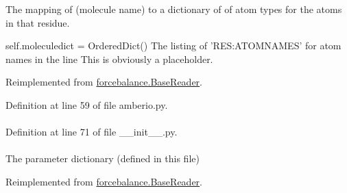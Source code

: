\-The mapping of (molecule name) to a dictionary of of atom types for the atoms in that residue. 

self.\-moleculedict = \-Ordered\-Dict() \-The listing of '\-R\-E\-S\-:\-A\-T\-O\-M\-N\-A\-M\-E\-S' for atom names in the line \-This is obviously a placeholder. 

\-Reimplemented from \hyperlink{classforcebalance_1_1BaseReader_ab444c213e15929253dd73395ac5f19fc}{forcebalance.\-Base\-Reader}.



\-Definition at line 59 of file amberio.\-py.

\hypertarget{classforcebalance_1_1BaseReader_a4369b5fb663a83b11602daa71db6862e}{
\paragraph[{\-Molecules}]{}}\label{classforcebalance_1_1BaseReader_a4369b5fb663a83b11602daa71db6862e}


\-Definition at line 71 of file \-\_\-\-\_\-init\-\_\-\-\_\-.\-py.

\hypertarget{classforcebalance_1_1amberio_1_1Mol2__Reader_a638d61a7ff3ae5bd27d70a71f9b063ae}{
\paragraph[{pdict}]{}}\label{classforcebalance_1_1amberio_1_1Mol2__Reader_a638d61a7ff3ae5bd27d70a71f9b063ae}


\-The parameter dictionary (defined in this file) 



\-Reimplemented from \hyperlink{classforcebalance_1_1BaseReader_aaf18c900d6055ed4b5124f6bb26164c1}{forcebalance.\-Base\-Reader}.



